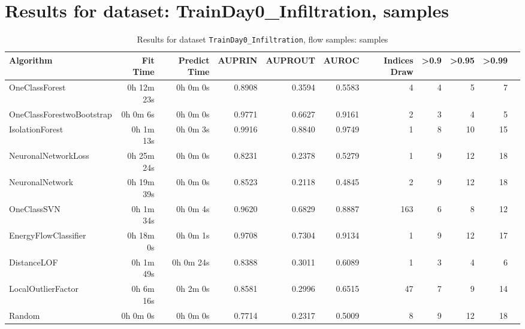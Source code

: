 \documentclass{article}
\begin{document}
\section*{Results for dataset: TrainDay0_Infiltration, samples}
\begin{table}[h!]
\centering
\caption{Results for dataset \texttt{TrainDay0_Infiltration}, flow samples: samples}
\label{tab:trainday0infiltration_samples}
\begin{tabular}{lrrrrrrrrrr}
\toprule
Algorithm & Fit Time & Predict Time & AUPRIN & AUPROUT & AUROC & Indices Draw & >0.9 & >0.95 & >0.99 \\
\midrule
OneClassForest & 0h 12m 23s & 0h 0m 0s & 0.8908 & 0.3594 & 0.5583 & 4 & 4 & 5 & 7 \\
OneClassForestwoBootstrap & 0h 0m 6s & 0h 0m 0s & 0.9771 & 0.6627 & 0.9161 & 2 & 3 & 4 & 5 \\
IsolationForest & 0h 1m 13s & 0h 0m 3s & 0.9916 & 0.8840 & 0.9749 & 1 & 8 & 10 & 15 \\
NeuronalNetworkLoss & 0h 25m 24s & 0h 0m 0s & 0.8231 & 0.2378 & 0.5279 & 1 & 9 & 12 & 18 \\
NeuronalNetwork & 0h 19m 39s & 0h 0m 0s & 0.8523 & 0.2118 & 0.4845 & 2 & 9 & 12 & 18 \\
OneClassSVN & 0h 1m 34s & 0h 0m 4s & 0.9620 & 0.6829 & 0.8887 & 163 & 6 & 8 & 12 \\
EnergyFlowClassifier & 0h 18m 0s & 0h 0m 1s & 0.9708 & 0.7304 & 0.9134 & 1 & 9 & 12 & 17 \\
DistanceLOF & 0h 1m 49s & 0h 0m 24s & 0.8388 & 0.3011 & 0.6089 & 1 & 3 & 4 & 6 \\
LocalOutlierFactor & 0h 6m 16s & 0h 2m 0s & 0.8581 & 0.2996 & 0.6515 & 47 & 7 & 9 & 14 \\
Random & 0h 0m 0s & 0h 0m 0s & 0.7714 & 0.2317 & 0.5009 & 8 & 9 & 12 & 18 \\
\bottomrule
\end{tabular}
\end{table}
\end{document}
